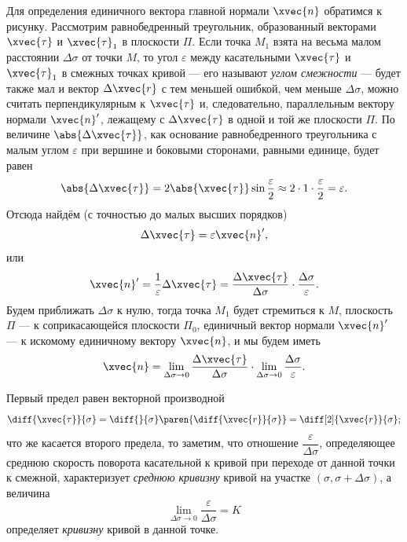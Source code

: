 Для определения единичного вектора главной нормали $\xvec{n}$ обратимся к
рисунку. Рассмотрим равнобедренный треугольник, образованный векторами
$\xvec{\tau}$ и $\xvec{\tau}_1$ в плоскости $\Pi$. Если точка $M_1$ взята на
весьма малом расстоянии $\Delta \sigma$ от точки $M$, то угол $\varepsilon$
между касательными $\xvec{\tau}$ и $\xvec{\tau}_1$ в смежных точках кривой ---
его называют \textit{углом смежности} --- будет также мал и вектор
$\Delta \xvec{r}$ с тем меньшей ошибкой, чем меньше $\Delta \sigma$, можно
считать перпендикулярным к $\xvec{\tau}$ и, следовательно, параллельным вектору
нормали $\xvec{n}'$, лежащему с $\Delta \xvec{\tau}$ в одной и той же плоскости
$\Pi$. По величине $\abs{\Delta \xvec{\tau}}$, как основание равнобедренного
треугольника с малым углом $\varepsilon$ при вершине и боковыми сторонами,
равными единице, будет равен
\begin{equation*}
  \abs{\Delta \xvec{\tau}} = 2 \abs{\xvec{\tau}} \sin \frac{\varepsilon}{2}
    \approx 2 \cdot 1 \cdot \frac{\varepsilon}{2} = \varepsilon.
\end{equation*}
Отсюда найдём (с точностью до малых высших порядков)
\begin{equation*}
  \Delta \xvec{\tau} = \varepsilon \xvec{n}',
\end{equation*}
или
\begin{equation*}
  \xvec{n}' = \frac{1}{\varepsilon} \Delta \xvec{\tau} =
    \frac{\Delta \xvec{\tau}}{\Delta \sigma} \cdot
    \frac{\Delta \sigma}{\varepsilon}.
\end{equation*}
Будем приближать $\Delta \sigma$ к нулю, тогда точка $M_1$ будет стремиться к
$M$, плоскость $\Pi$ --- к соприкасающейся плоскости $\Pi_0$, единичный вектор
нормали $\xvec{n}'$ --- к искомому единичному вектору $\xvec{n}$, и мы будем
иметь
\begin{equation*}
  \xvec{n} = \lim_{\Delta \sigma \to 0} \frac{\Delta \xvec{\tau}}{\Delta \sigma}
    \cdot \lim_{\Delta \sigma \to 0} \frac{\Delta \sigma}{\varepsilon}.
\end{equation*}

Первый предел равен векторной производной
\begin{equation*}
  \diff{\xvec{\tau}}{\sigma} = \diff{}{\sigma} \paren{\diff{\xvec{r}}{\sigma}} =
    \diff[2]{\xvec{r}}{\sigma};
\end{equation*}
что же касается второго предела, то заметим, что отношение
$\dfrac{\varepsilon}{\Delta \sigma}$, определяющее среднюю скорость поворота
касательной к кривой при переходе от данной точки к смежной, характеризует
\textit{среднюю кривизну} кривой на участке $(\sigma, \sigma + \Delta \sigma)$,
а величина
\begin{equation}
  \lim_{\Delta \sigma \to 0} \frac{\varepsilon}{\Delta \sigma} = K
\end{equation}
определяет \textit{кривизну} кривой в данной точке.

